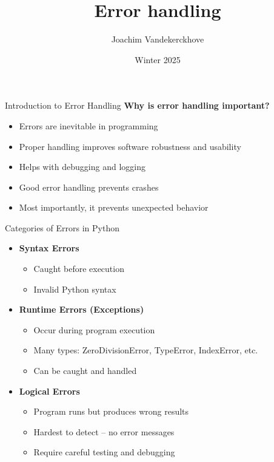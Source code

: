 \documentclass[aspectratio=169]{beamer}
\title{Error handling}
\author{Joachim Vandekerckhove}
\date{Winter 2025}
\begin{document}
\frame{\titlepage}

\begin{frame}{Introduction to Error Handling}
    \textbf{Why is error handling important?}
    \begin{itemize}[<+->]
        \item Errors are inevitable in programming
        \item Proper handling improves software robustness and usability
        \item Helps with debugging and logging
        \item Good error handling prevents crashes
        \item Most importantly, it prevents unexpected behavior
    \end{itemize}
\end{frame}

\begin{frame}{Categories of Errors in Python}
    \begin{itemize}
        \item<1-> \textbf{Syntax Errors}
        \begin{itemize}[<2->]
            \item Caught before execution
            \item Invalid Python syntax
        \end{itemize}
        \item<3-> \textbf{Runtime Errors (Exceptions)}
        \begin{itemize}[<4->]
            \item Occur during program execution
            \item Many types: ZeroDivisionError, TypeError, IndexError, etc.
            \item Can be caught and handled
        \end{itemize}
        \item<5-> \textbf{Logical Errors}
        \begin{itemize}[<6->]
            \item Program runs but produces wrong results
            \item Hardest to detect -- no error messages
            \item Require careful testing and debugging
        \end{itemize}
    \end{itemize}
\end{frame}
\end{document}

